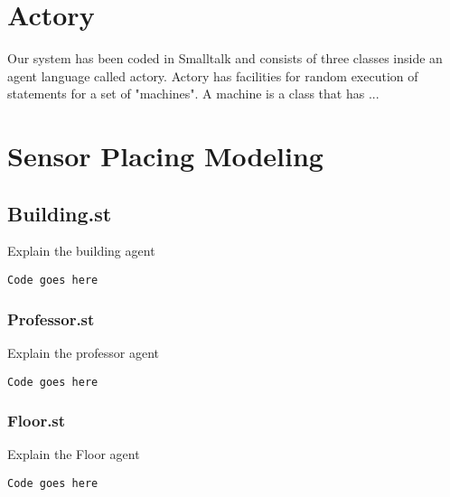 \section{Actory} 
Our system has been coded in Smalltalk and consists of three classes inside an agent language
called actory. Actory has facilities for random execution of statements for a set of "machines".
A machine is a class that has ...


\section{Sensor Placing Modeling}

\subsection{Building.st}
Explain the building agent
\begin{footnotesize}
\begin{verbatim}
Code goes here
\end{verbatim}
\end{footnotesize}


\subsubsection{Professor.st}
Explain the professor agent
\begin{footnotesize}
\begin{verbatim}
Code goes here
\end{verbatim}
\end{footnotesize}


\subsubsection{Floor.st}
Explain the Floor agent
\begin{footnotesize}
\begin{verbatim}
Code goes here
\end{verbatim}
\end{footnotesize}


